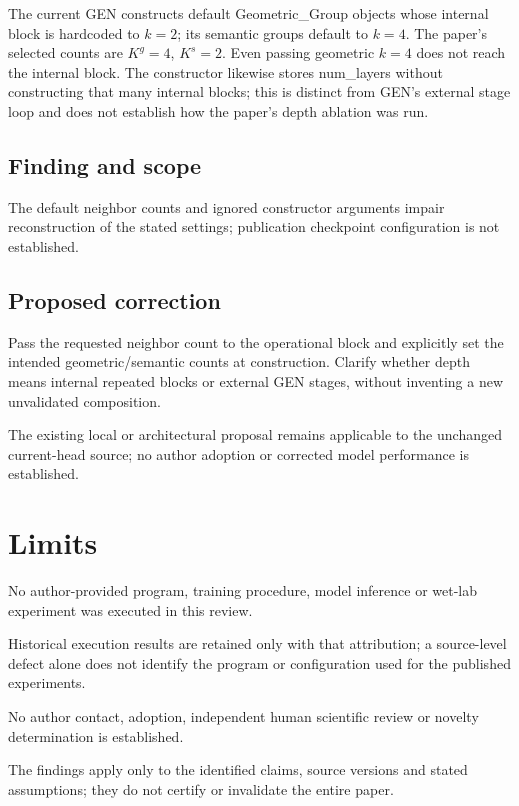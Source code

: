 \documentclass[11pt]{article}
\begin{document}
The current GEN constructs default Geometric\_Group objects whose internal block is hardcoded to \(k=2\); its semantic groups default to \(k=4\). The paper’s selected counts are \(K^g=4\), \(K^s=2\). Even passing geometric \(k=4\) does not reach the internal block. The constructor likewise stores num\_layers without constructing that many internal blocks; this is distinct from GEN’s external stage loop and does not establish how the paper’s depth ablation was run.

\subsection*{Finding and scope}

The default neighbor counts and ignored constructor arguments impair reconstruction of the stated settings; publication checkpoint configuration is not established.

\subsection*{Proposed correction}

Pass the requested neighbor count to the operational block and explicitly set the intended geometric/semantic counts at construction. Clarify whether depth means internal repeated blocks or external GEN stages, without inventing a new unvalidated composition.

The existing local or architectural proposal remains applicable to the unchanged current-head source; no author adoption or corrected model performance is established.

\section*{Limits}

No author-provided program, training procedure, model inference or wet-lab experiment was executed in this review.\par

Historical execution results are retained only with that attribution; a source-level defect alone does not identify the program or configuration used for the published experiments.\par

No author contact, adoption, independent human scientific review or novelty determination is established.\par

The findings apply only to the identified claims, source versions and stated assumptions; they do not certify or invalidate the entire paper.\par
\end{document}
